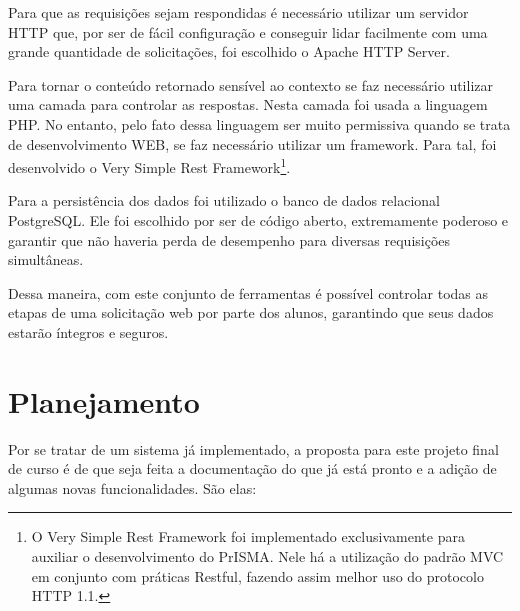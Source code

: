 \documentclass[graduacao,brazil]{ThesisPUC}
\begin{document}
Para que as requisições sejam respondidas é necessário utilizar um servidor HTTP que, por ser de fácil configuração e conseguir lidar facilmente com uma grande quantidade de solicitações, foi escolhido o Apache HTTP Server\cite{Apache}.

Para tornar o conteúdo retornado sensível ao contexto se faz necessário utilizar uma camada para controlar as respostas. Nesta camada foi usada a linguagem PHP\cite{PHP}. No entanto, pelo fato dessa linguagem ser muito permissiva quando se trata de desenvolvimento WEB, se faz necessário utilizar um framework. Para tal, foi desenvolvido o Very Simple Rest Framework\cite{RestFW}\footnote{O Very Simple Rest Framework foi implementado exclusivamente para auxiliar o desenvolvimento do PrISMA. Nele há a utilização do padrão MVC em conjunto com práticas Restful\cite{Rest}, fazendo assim melhor uso do protocolo HTTP 1.1\cite{HTTP11}.}.

Para a persistência dos dados foi utilizado o banco de dados relacional PostgreSQL\cite{PostgreSQL}. Ele foi escolhido por ser de código aberto, extremamente poderoso e garantir que não haveria perda de desempenho para diversas requisições simultâneas.

Dessa maneira, com este conjunto de ferramentas é possível controlar todas as etapas de uma solicitação web por parte dos alunos, garantindo que seus dados estarão íntegros e seguros.


\chapter{Planejamento}

Por se tratar de um sistema já implementado, a proposta para este projeto final de curso é de que seja feita a documentação do que já está pronto e a adição de algumas novas funcionalidades. São elas:
\end{document}
